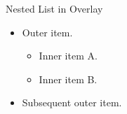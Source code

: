 \documentclass[14pt,t]{beamer-accessibility}
\begin{document}
\begin{frame}{Nested List in Overlay}
\begin{itemize}
\item<1-> Outer item.
  \begin{itemize}
  \item Inner item A.
  \item Inner item B.
  \end{itemize}
\item<2-> Subsequent outer item.
\end{itemize}
\end{frame}
\end{document}
